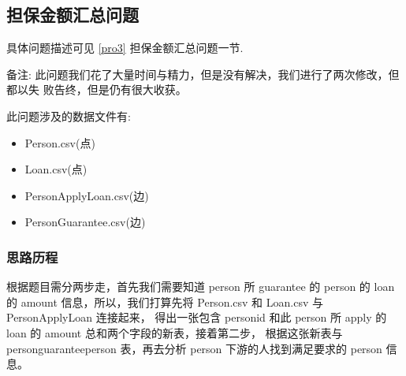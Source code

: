 \subsection{担保金额汇总问题}
具体问题描述可见 \ref{pro3} 担保金额汇总问题一节.

备注: 此问题我们花了大量时间与精力，但是没有解决，我们进行了两次修改，但都以失
败告终，但是仍有很大收获。

此问题涉及的数据文件有:
\begin{itemize}
  \item Person.csv(点)
  \item Loan.csv(点)
  \item PersonApplyLoan.csv(边)
  \item PersonGuarantee.csv(边)
\end{itemize}

\subsubsection{思路历程}
根据题目需分两步走，首先我们需要知道 person 所 guarantee 的 person 的 loan
的 amount 信息，所以，我们打算先将 Person.csv 和 Loan.csv 与 PersonApplyLoan 连接起来，
得出一张包含 personid 和此 person 所 apply 的 loan 的 amount 总和两个字段的新表，接着第二步，
根据这张新表与 personguaranteeperson 表，再去分析 person 下游的人找到满足要求的
person 信息。

